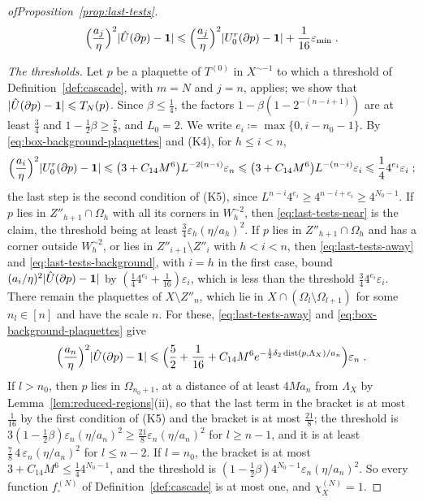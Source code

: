 \documentclass[11pt]{preprint}
\newcommand{\id}{\mathbf 1}
\newcommand{\dist}{\operatorname{dist}}
\DeclarePairedDelimiter{\abs}{\lvert}{\rvert}
\numberwithin{equation}{section}
\begin{document}
\begin{proof}[ofProposition~\ref{prop:last-tests}]
\begin{equation}\label{eq:last-tests-away}
    \Bigl(\frac{a_j}{\eta}\Bigr)^2\abs{\hat U(\partial p) - \id} \leqslant \Bigl(\frac{a_j}{\eta}\Bigr)^2\abs{U^r_0(\partial p) - \id} + \frac{1}{16}\varepsilon_{\min}\;.
\end{equation}

\emph{The thresholds.} Let $p$ be a plaquette of $T^{(0)}$ in $X^{\sim-1}$ to which a threshold of Definition~\ref{def:cascade}, with $m = N$ and $j = n$, applies; we show that $\abs{\hat U(\partial p) - \id} \leqslant T_N(p)$. Since $\beta \leqslant \frac{1}{4}$, the factors $1 - \beta(1 - 2^{-(n-i+1)})$ are at least $\frac{3}{4}$ and $1 - \frac{1}{2}\beta \geqslant \frac{7}{8}$, and $L_0 = 2$. We write $e_i \coloneqq \max\{ 0, i - n_0 - 1 \}$. By \eqref{eq:box-background-plaquettes} and (K4), for $h \leqslant i < n$,
\begin{equation}\label{eq:last-tests-background}
    \Bigl(\frac{a_i}{\eta}\Bigr)^2\abs{U^r_0(\partial p) - \id} \leqslant \bigl(3 + C_{14}M^6\bigr)L^{-2(n-i)}\varepsilon_n \leqslant \bigl(3 + C_{14}M^6\bigr)L^{-(n-i)}\varepsilon_i \leqslant \frac{1}{4}4^{e_i}\varepsilon_i\;;
\end{equation}
the last step is the second condition of (K5), since $L^{n-i}4^{e_i} \geqslant 4^{n-i+e_i} \geqslant 4^{N_0-1}$. If $p$ lies in $Z''_{h+1} \cap \Omega_h$ with all its corners in $W_h^{\sim2}$, then \eqref{eq:last-tests-near} is the claim, the threshold being at least $\frac{3}{4}\varepsilon_h(\eta/a_h)^2$. If $p$ lies in $Z''_{h+1} \cap \Omega_h$ and has a corner outside $W_h^{\sim2}$, or lies in $Z''_{i+1} \setminus Z''_i$ with $h < i < n$, then \eqref{eq:last-tests-away} and \eqref{eq:last-tests-background}, with $i = h$ in the first case, bound $(a_i/\eta)^2\abs{\hat U(\partial p) - \id}$ by $(\frac{1}{4}4^{e_i} + \frac{1}{16})\varepsilon_i$, which is less than the threshold $\frac{3}{4}4^{e_i}\varepsilon_i$. There remain the plaquettes of $X \setminus Z''_n$, which lie in $X \cap (\Omega_l \setminus \Omega_{l+1})$ for some $n_l \in [n]$ and have the scale $n$. For these, \eqref{eq:last-tests-away} and \eqref{eq:box-background-plaquettes} give
\[
    \Bigl(\frac{a_n}{\eta}\Bigr)^2\abs{\hat U(\partial p) - \id} \leqslant \Bigl(\frac{5}{2} + \frac{1}{16} + C_{14}M^6e^{-\frac{1}{2}\delta_2\dist(p, \Lambda_X)/a_n}\Bigr)\varepsilon_n\;.
\]
If $l > n_0$, then $p$ lies in $\Omega_{n_0+1}$, at a distance of at least $4Ma_n$ from $\Lambda_X$ by Lemma~\ref{lem:reduced-regions}(ii), so that the last term in the bracket is at most $\frac{1}{16}$ by the first condition of (K5) and the bracket is at most $\frac{21}{8}$; the threshold is $3(1 - \frac{1}{2}\beta)\varepsilon_n(\eta/a_n)^2 \geqslant \frac{21}{8}\varepsilon_n(\eta/a_n)^2$ for $l \geqslant n - 1$, and it is at least $\frac{7}{8}\,4\,\varepsilon_n(\eta/a_n)^2$ for $l \leqslant n - 2$. If $l = n_0$, the bracket is at most $3 + C_{14}M^6 \leqslant \frac{1}{4}4^{N_0-1}$, and the threshold is $(1 - \frac{1}{2}\beta)4^{N_0-1}\varepsilon_n(\eta/a_n)^2$. So every function $f^{(N)}_\square$ of Definition~\ref{def:cascade} is at most one, and $\chi^{(N)}_X = 1$.
\end{proof}
\end{document}
